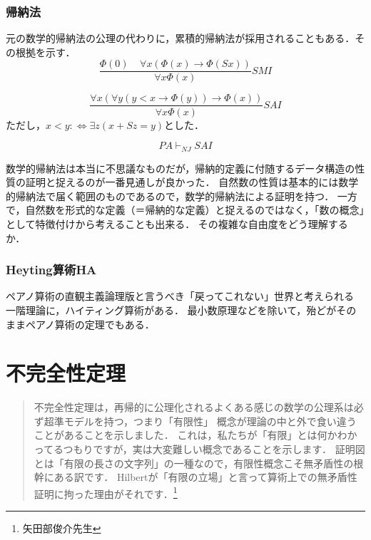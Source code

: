 \documentclass[uplatex, dvipdfmx]{jsreport}
\begin{document}
\subsection{帰納法}

元の数学的帰納法の公理の代わりに，累積的帰納法が採用されることもある．その根拠を示す．
\[\frac{\Phi(0)\;\;\;\;\forall x(\Phi(x)\to\Phi(Sx))}{\forall x\Phi(x)}SMI\]

\begin{definition}
    \[\frac{\forall x(\forall y(y<x\to\Phi(y))\to\Phi(x))}{\forall x\Phi(x)}SAI\]
    ただし，$x<y:\Leftrightarrow\exists z(x+Sz=y)$とした．
\end{definition}

\begin{proposition}[累積的帰納法]
    \[PA\vdash_{NJ}SAI\]
\end{proposition}

\begin{screen}
    数学的帰納法は本当に不思議なものだが，帰納的定義に付随するデータ構造の性質の証明と捉えるのが一番見通しが良かった．
    自然数の性質は基本的には数学的帰納法で届く範囲のものであるので，数学的帰納法による証明を持つ．
    一方で，自然数を形式的な定義（＝帰納的な定義）と捉えるのではなく，「数の概念」として特徴付けから考えることも出来る．
    その複雑な自由度をどう理解するか．
\end{screen}

\subsection{Heyting算術HA}
ペアノ算術の直観主義論理版と言うべき「戻ってこれない」世界と考えられる
一階理論に，ハイティング算術がある．
最小数原理などを除いて，殆どがそのままペアノ算術の定理でもある．

\chapter{不完全性定理}

\begin{quote}
    不完全性定理は，再帰的に公理化されるよくある感じの数学の公理系は必ず超準モデルを持つ，つまり「有限性」
    概念が理論の中と外で食い違うことがあることを示しました．
    これは，私たちが「有限」とは何かわかってるつもりですが，実は大変難しい概念であることを示します．
    証明図とは「有限の長さの文字列」の一種なので，有限性概念こそ無矛盾性の根幹にある訳です．
    Hilbertが「有限の立場」と言って算術上での無矛盾性証明に拘った理由がそれです．\footnote{矢田部俊介先生}
\end{quote}
\end{document}

